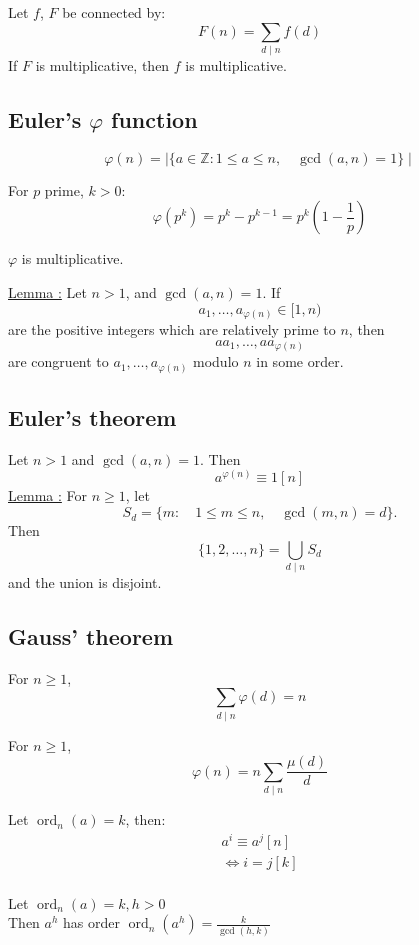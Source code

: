 \documentclass{report}
\DeclareMathOperator{\ord}{ord}
\begin{document}
\begin{thm}
	Let $f$, $F$ be connected by:
	\[F(n)=\sum_{d \mid n} f(d)\]
	If $F$ is multiplicative, then $f$ is multiplicative.
\end{thm}

\subsection*{Euler's $\varphi$ function} 
\[\varphi(n)=\mid \{ a \in \mathbb{Z} :1 \leq a \leq n,\quad \gcd(a,n)=1 \} \mid \]
\begin{thm}
	For $p$ prime, $k>0$:
	\[\varphi(p^k)=p^k-p^{k-1}=p^k(1-\frac{1}{p})\]
\end{thm}
\begin{thm} $\varphi$ is multiplicative.
\end{thm}
\underline{Lemma :} Let $n>1$, and $\gcd(a, n)=1$. If 
\begin{equation*}
a_1, \dots, a_{\varphi(n)}\in [1, n)
\end{equation*} 
are the positive integers which are relatively prime to $n$, then 
\begin{equation*}
aa_1, \dots, aa_{\varphi(n)}
\end{equation*}
are congruent to $a_1, \dots, a_{\varphi(n)}$ modulo $n$ in some order.
\subsection*{Euler's theorem}
Let $n>1$ and $\gcd(a, n)=1$. Then 
\begin{equation*}
a^{\varphi(n)}\equiv 1 [n]
\end{equation*}
\underline{Lemma :} For $n\geq 1$, let
\begin{equation*}
S_d = \{m: \quad 1\leq m\leq n,\quad \gcd(m, n)=d\}.
\end{equation*}
Then 
\begin{equation*}
\{1, 2, \dots, n\} = \bigcup_{d \mid n}S_d
\end{equation*}
and the union is disjoint.
\subsection*{Gauss' theorem}
For $n\geq 1$, 
\begin{equation*}
\sum_{d\mid n}\varphi(d)=n
\end{equation*}
\begin{thm}
	For $n\geq 1$,
	\begin{equation*}
	\varphi(n) = n\sum_{d\mid n}\frac{\mu(d)}{d}
	\end{equation*}
\end{thm}
\begin{thm} Let $\ord_n(a)=k$, then:
	\[\begin{array}{lcl}
	a^i\equiv a^j[n]\\
	\iff i=j[k]\\
	\end{array}
	\]
\end{thm}
\begin{thm}
	Let $\ord_n(a)=k, h>0$\\
	Then $a^h$ has order $\ord_n(a^h)= \frac{k}{\gcd(h,k)}$\\
\end{thm}
\end{document}

